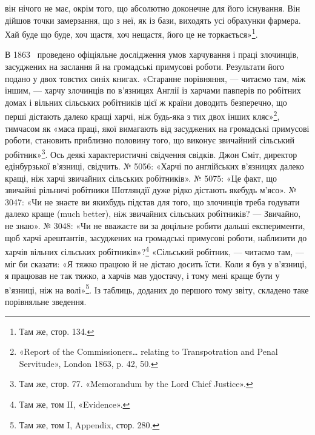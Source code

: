 \parcont{}  %
він нічого не має, окрім того, що абсолютно доконечне для його
існування. Він дійшов точки замерзання, що з неї, як із бази,
виходять усі обрахунки фармера. Хай буде що буде, хоч щастя,
хоч нещастя, його це не торкається»\footnote{
Там же, стор. 134.
}.

В 1863~ проведено офіціяльне дослідження умов харчування
і праці злочинців, засуджених на заслання й на громадські примусові
роботи. Результати його подано у двох товстих синіх
книгах. «Старанне порівняння, — читаємо там, між іншим, —
харчу злочинців по в’язницях Англії із харчами павперів по
робітних домах і вільних сільських робітників цієї ж країни
доводить безперечно, що перші дістають далеко кращі харчі,
ніж будь-яка з тих двох інших кляс»\footnote{
«Report of the Commissioners\dots{} relating to Transpotration and
Penal Servitude», London 1863, p. 42, 50.
}, тимчасом як «маса
праці, якої вимагають від засуджених на громадські примусові
роботи, становить приблизно половину того, що виконує звичайний
сільський робітник»\footnote{
Там же, стор. 77. «Memorandum by the Lord Chief Justice».
}. Ось деякі характеристичні свідчення
свідків. Джон Сміт, директор едінбурзької в’язниці, свідчить.
№ 5056: «Харчі по англійських в’язницях далеко кращі, ніж
харчі звичайних сільських робітників». № 5075: «Це факт, що
звичайні рільничі робітники Шотляндії дуже рідко дістають якебудь
м’ясо». № 3047: «Чи не знаєте ви якихбудь підстав для
того, що злочинців треба годувати далеко краще (much better),
ніж звичайних сільських робітників? — Звичайно, не знаю».
№ 3048: «Чи не вважаєте ви за доцільне робити дальші експерименти,
щоб харчі арештантів, засуджених на громадські примусові
роботи, наблизити до харчів вільних сільських робітників»?\footnote{
Там же, том II, «Evidence».
} «Сільський робітник, — читаємо там, — міг би сказати:
«Я тяжко працюю й не дістаю досить їсти. Коли я був у
в’язниці, я працював не так тяжко, а харчів мав удостачу, і тому
мені краще бути у в’язниці, ніж на волі»\footnote{
Там же, том I, Appendix, стор. 280.
}. Із таблиць, доданих
до першого тому звіту, складено таке порівняльне зведення.

